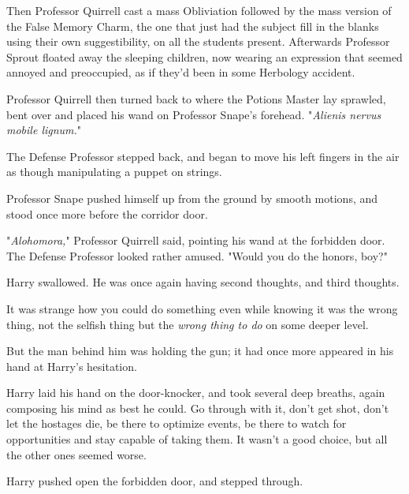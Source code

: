 Then Professor Quirrell cast a mass Obliviation followed by the mass version of 
the False Memory Charm, the one that just had the subject fill in the blanks 
using their own suggestibility, on all the students present. Afterwards 
Professor Sprout floated away the sleeping children, now wearing an expression 
that seemed annoyed and preoccupied, as if they'd been in some Herbology 
accident.

Professor Quirrell then turned back to where the Potions Master lay sprawled, 
bent over and placed his wand on Professor Snape's forehead. "\emph{Alienis 
nervus mobile lignum.}"

The Defense Professor stepped back, and began to move his left fingers in the 
air as though manipulating a puppet on strings.

Professor Snape pushed himself up from the ground by smooth motions, and stood 
once more before the corridor door.

"\emph{Alohomora,}" Professor Quirrell said, pointing his wand at the forbidden 
door. The Defense Professor looked rather amused. "Would you do the honors, 
boy?"

Harry swallowed. He was once again having second thoughts, and third thoughts.

It was strange how you could do something even while knowing it was the wrong 
thing, not the selfish thing but the \emph{wrong thing to do} on some deeper 
level.

But the man behind him was holding the gun; it had once more appeared in his 
hand at Harry's hesitation.

Harry laid his hand on the door-knocker, and took several deep breaths, again 
composing his mind as best he could. Go through with it, don't get shot, don't 
let the hostages die, be there to optimize events, be there to watch for 
opportunities and stay capable of taking them. It wasn't a good choice, but all 
the other ones seemed worse.

Harry pushed open the forbidden door, and stepped through.
